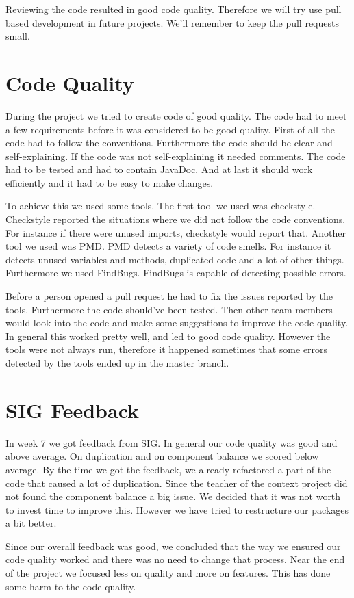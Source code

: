 Reviewing the code resulted in good code quality. Therefore we will try use pull based development in future projects. We'll remember to keep the pull requests small. 

\section{Code Quality}\label{codequality}
During the project we tried to create code of good quality. The code had to meet a few requirements before it was considered to be good quality. First of all the code had to follow the conventions. Furthermore the code should be clear and self-explaining. If the code was not self-explaining it needed comments. The code had to be tested and had to contain JavaDoc. And at last it should work efficiently and it had to be easy to make changes.
 
To achieve this we used some tools. The first tool we used was checkstyle. Checkstyle reported the situations where we did not follow the code conventions. For instance if there were unused imports, checkstyle would report that. 
Another tool we used was PMD. PMD detects a variety of code smells. For instance it detects unused variables and methods, duplicated code and a lot of other things.
Furthermore we used FindBugs. FindBugs is capable of detecting possible errors.

Before a person opened a pull request he had to fix the issues reported by the tools. Furthermore the code should've been tested. Then other team members would look into the code and make some suggestions to improve the code quality.
In general this worked pretty well, and led to good code quality. However the tools were not always run, therefore it happened sometimes that some errors detected by the tools ended up in the master branch. 

\section{SIG Feedback}
In week 7 we got feedback from SIG. In general our code quality was good and above average. On duplication and on component balance we scored below average. By the time we got the feedback, we already refactored a part of the code that caused a lot of duplication. Since the teacher of the context project did not found the component balance a big issue. We decided that it was not worth to invest time to improve this. However we have tried to restructure our packages a bit better. 

Since our overall feedback was good, we concluded that the way we ensured our code quality worked and there was no need to change that process.
Near the end of the project we focused less on quality and more on features. This has done some harm to the code quality.